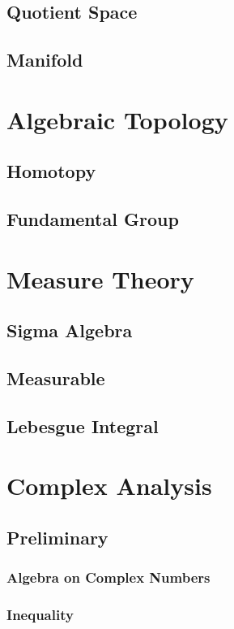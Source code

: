 \documentclass[twoside,openright]{report}
\begin{document}
\section{Quotient Space}
\section{Manifold}

\chapter{Algebraic Topology}
\section{Homotopy}
\section{Fundamental Group}




\chapter{Measure Theory}
\section{Sigma Algebra}
\section{Measurable}
\section{Lebesgue Integral}

\chapter{Complex Analysis}
\section{Preliminary}
\subsection{Algebra on Complex Numbers}
\subsection{Inequality}
\end{document}
